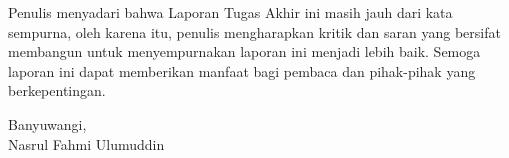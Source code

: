 Penulis menyadari bahwa Laporan Tugas Akhir ini masih jauh dari kata sempurna, oleh karena itu, penulis mengharapkan kritik dan saran yang bersifat membangun untuk menyempurnakan laporan ini menjadi lebih baik. Semoga laporan ini dapat memberikan manfaat bagi pembaca dan pihak-pihak yang berkepentingan.

\begin{flushright}
    Banyuwangi, \tglpengesahan \\[1.5cm]
    
    Nasrul Fahmi Ulumuddin
\end{flushright}
